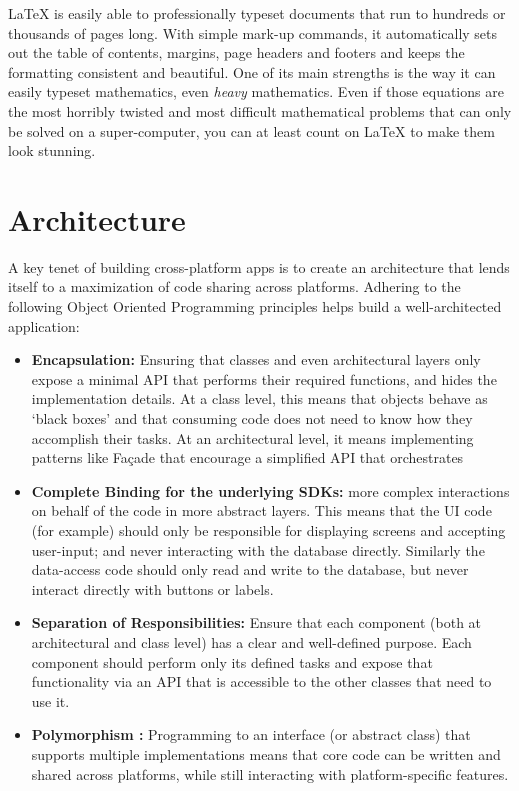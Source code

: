\LaTeX{} is easily able to professionally typeset documents that run to hundreds or thousands of pages long. With simple mark-up commands, it automatically sets out the table of contents, margins, page headers and footers and keeps the formatting consistent and beautiful. One of its main strengths is the way it can easily typeset mathematics, even \emph{heavy} mathematics. Even if those equations are the most horribly twisted and most difficult mathematical problems that can only be solved on a super-computer, you can at least count on \LaTeX{} to make them look stunning.


\section{Architecture}

A key tenet of building cross-platform apps is to create an architecture that lends itself to a maximization of code sharing across platforms. Adhering to the following Object Oriented Programming principles helps build a well-architected application:
 \begin{itemize}
\item \textbf{ Encapsulation:}     Ensuring that classes and even architectural layers only expose a minimal API that performs their required functions, and hides the implementation details. At a class level, this means that objects behave as ‘black boxes’ and that consuming code does not need to know how they accomplish their tasks. At an architectural level, it means implementing patterns like Façade that encourage a simplified API that orchestrates
\item \textbf{ Complete Binding for the underlying SDKs:}   more complex interactions on behalf of the code in more abstract layers. This means that the UI code (for example) should only be responsible for displaying screens and accepting user-input; and never interacting with the database directly. Similarly the data-access code should only read and write to the database, but never interact directly with buttons or labels.
\item \textbf{ Separation of Responsibilities:}     Ensure that each component (both at architectural and class level) has a clear and well-defined purpose. Each component should perform only its defined tasks and expose that functionality via an API that is accessible to the other classes that need to use it.
\item \textbf{ Polymorphism :}   Programming to an interface (or abstract class) that supports multiple implementations means that core code can be written and shared across platforms, while still interacting with platform-specific features.

\end{itemize}

